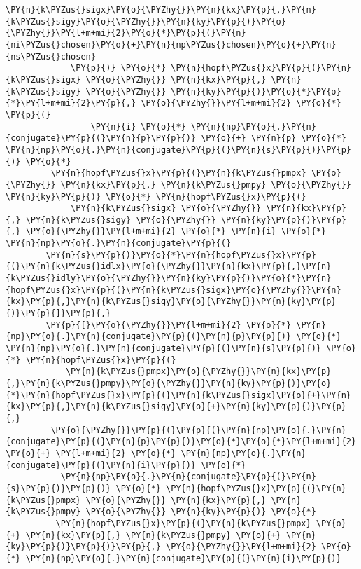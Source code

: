 \begin{Verbatim}[commandchars=\\\{\}]
             \PY{n}{k\PYZus{}sigx}\PY{o}{\PYZhy{}}\PY{n}{kx}\PY{p}{,}\PY{n}{k\PYZus{}sigy}\PY{o}{\PYZhy{}}\PY{n}{ky}\PY{p}{)}\PY{o}{\PYZhy{}}\PY{l+m+mi}{2}\PY{o}{*}\PY{p}{(}\PY{n}{ni\PYZus{}chosen}\PY{o}{+}\PY{n}{np\PYZus{}chosen}\PY{o}{+}\PY{n}{ns\PYZus{}chosen}
             \PY{p}{)} \PY{o}{*} \PY{n}{hopf\PYZus{}x}\PY{p}{(}\PY{n}{k\PYZus{}sigx} \PY{o}{\PYZhy{}} \PY{n}{kx}\PY{p}{,} \PY{n}{k\PYZus{}sigy} \PY{o}{\PYZhy{}} \PY{n}{ky}\PY{p}{)}\PY{o}{*}\PY{o}{*}\PY{l+m+mi}{2}\PY{p}{,} \PY{o}{\PYZhy{}}\PY{l+m+mi}{2} \PY{o}{*} \PY{p}{(}
                 \PY{n}{i} \PY{o}{*} \PY{n}{np}\PY{o}{.}\PY{n}{conjugate}\PY{p}{(}\PY{n}{p}\PY{p}{)} \PY{o}{+} \PY{n}{p} \PY{o}{*} \PY{n}{np}\PY{o}{.}\PY{n}{conjugate}\PY{p}{(}\PY{n}{s}\PY{p}{)}\PY{p}{)} \PY{o}{*}
         \PY{n}{hopf\PYZus{}x}\PY{p}{(}\PY{n}{k\PYZus{}pmpx} \PY{o}{\PYZhy{}} \PY{n}{kx}\PY{p}{,} \PY{n}{k\PYZus{}pmpy} \PY{o}{\PYZhy{}} \PY{n}{ky}\PY{p}{)} \PY{o}{*} \PY{n}{hopf\PYZus{}x}\PY{p}{(}
             \PY{n}{k\PYZus{}sigx} \PY{o}{\PYZhy{}} \PY{n}{kx}\PY{p}{,} \PY{n}{k\PYZus{}sigy} \PY{o}{\PYZhy{}} \PY{n}{ky}\PY{p}{)}\PY{p}{,} \PY{o}{\PYZhy{}}\PY{l+m+mi}{2} \PY{o}{*} \PY{n}{i} \PY{o}{*} \PY{n}{np}\PY{o}{.}\PY{n}{conjugate}\PY{p}{(}
        \PY{n}{s}\PY{p}{)}\PY{o}{*}\PY{n}{hopf\PYZus{}x}\PY{p}{(}\PY{n}{k\PYZus{}idlx}\PY{o}{\PYZhy{}}\PY{n}{kx}\PY{p}{,}\PY{n}{k\PYZus{}idly}\PY{o}{\PYZhy{}}\PY{n}{ky}\PY{p}{)}\PY{o}{*}\PY{n}{hopf\PYZus{}x}\PY{p}{(}\PY{n}{k\PYZus{}sigx}\PY{o}{\PYZhy{}}\PY{n}{kx}\PY{p}{,}\PY{n}{k\PYZus{}sigy}\PY{o}{\PYZhy{}}\PY{n}{ky}\PY{p}{)}\PY{p}{]}\PY{p}{,}
        \PY{p}{[}\PY{o}{\PYZhy{}}\PY{l+m+mi}{2} \PY{o}{*} \PY{n}{np}\PY{o}{.}\PY{n}{conjugate}\PY{p}{(}\PY{n}{p}\PY{p}{)} \PY{o}{*} \PY{n}{np}\PY{o}{.}\PY{n}{conjugate}\PY{p}{(}\PY{n}{s}\PY{p}{)} \PY{o}{*} \PY{n}{hopf\PYZus{}x}\PY{p}{(}
            \PY{n}{k\PYZus{}pmpx}\PY{o}{\PYZhy{}}\PY{n}{kx}\PY{p}{,}\PY{n}{k\PYZus{}pmpy}\PY{o}{\PYZhy{}}\PY{n}{ky}\PY{p}{)}\PY{o}{*}\PY{n}{hopf\PYZus{}x}\PY{p}{(}\PY{n}{k\PYZus{}sigx}\PY{o}{+}\PY{n}{kx}\PY{p}{,}\PY{n}{k\PYZus{}sigy}\PY{o}{+}\PY{n}{ky}\PY{p}{)}\PY{p}{,}
         \PY{o}{\PYZhy{}}\PY{p}{(}\PY{p}{(}\PY{n}{np}\PY{o}{.}\PY{n}{conjugate}\PY{p}{(}\PY{n}{p}\PY{p}{)}\PY{o}{*}\PY{o}{*}\PY{l+m+mi}{2} \PY{o}{+} \PY{l+m+mi}{2} \PY{o}{*} \PY{n}{np}\PY{o}{.}\PY{n}{conjugate}\PY{p}{(}\PY{n}{i}\PY{p}{)} \PY{o}{*}
           \PY{n}{np}\PY{o}{.}\PY{n}{conjugate}\PY{p}{(}\PY{n}{s}\PY{p}{)}\PY{p}{)} \PY{o}{*} \PY{n}{hopf\PYZus{}x}\PY{p}{(}\PY{n}{k\PYZus{}pmpx} \PY{o}{\PYZhy{}} \PY{n}{kx}\PY{p}{,} \PY{n}{k\PYZus{}pmpy} \PY{o}{\PYZhy{}} \PY{n}{ky}\PY{p}{)} \PY{o}{*}
          \PY{n}{hopf\PYZus{}x}\PY{p}{(}\PY{n}{k\PYZus{}pmpx} \PY{o}{+} \PY{n}{kx}\PY{p}{,} \PY{n}{k\PYZus{}pmpy} \PY{o}{+} \PY{n}{ky}\PY{p}{)}\PY{p}{)}\PY{p}{,} \PY{o}{\PYZhy{}}\PY{l+m+mi}{2} \PY{o}{*} \PY{n}{np}\PY{o}{.}\PY{n}{conjugate}\PY{p}{(}\PY{n}{i}\PY{p}{)}

\end{Verbatim}
